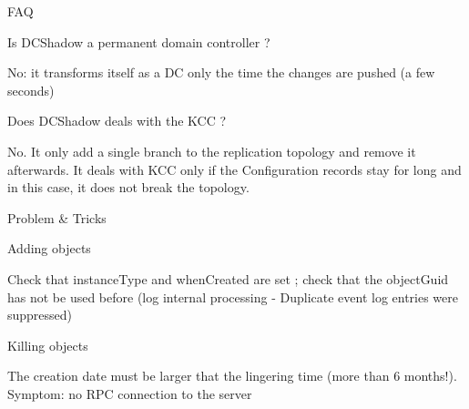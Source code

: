 FAQ

Is DCShadow a permanent domain controller ?

No: it transforms itself as a DC only the time the changes are pushed (a few seconds)

Does DCShadow deals with the KCC ?

No. It only add a single branch to the replication topology and remove it afterwards. It deals with KCC only if the Configuration records stay for long and in this case, it does not break the topology.

Problem \& Tricks

Adding objects

Check that instanceType and whenCreated are set ; check that the objectGuid has not be used before (log internal processing - Duplicate event log entries were suppressed)

Killing objects

The creation date must be larger that the lingering time (more than 6 months!). Symptom: no RPC connection to the server